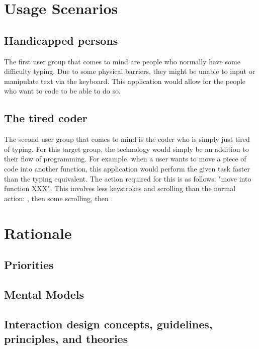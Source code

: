 \documentclass[11pt, oneside]{article}
\begin{document}
\section{Usage Scenarios}

\subsection{Handicapped persons}

The first user group that comes to mind are people who normally have some difficulty typing. Due to some physical barriers, they might be unable to input or manipulate text via the keyboard. This application would allow for the people who want to code to be able to do so. 

\subsection{The tired coder}

The second user group that comes to mind is the coder who is simply just tired of typing. For this target group, the technology would simply be an addition to their flow of programming. For example, when a user wants to move a piece of code into another function, this application would perform the given task faster than the typing equivalent. The action required for this is as follows:  "move into function XXX". This involves less keystrokes and scrolling than the normal action: , then some scrolling, then .




\section{Rationale}

\subsection{Priorities}

\subsection{Mental Models}

\subsection{Interaction design concepts, guidelines, principles, and theories}
\end{document}
